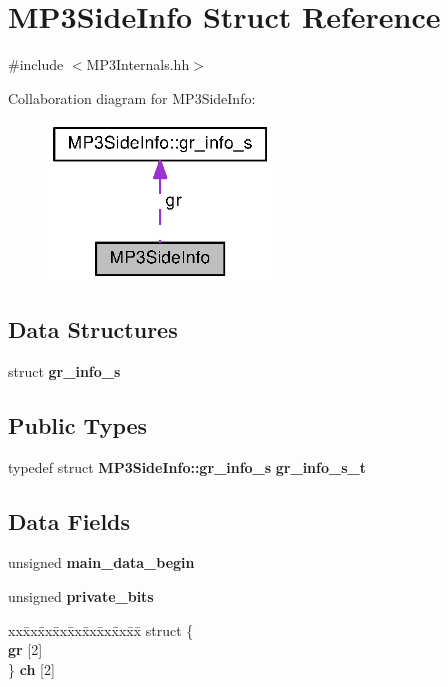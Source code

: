 \section{M\+P3\+Side\+Info Struct Reference}
\label{structMP3SideInfo}


{\ttfamily \#include $<$M\+P3\+Internals.\+hh$>$}



Collaboration diagram for M\+P3\+Side\+Info\+:
\nopagebreak
\begin{figure}[H]
\begin{center}
\leavevmode
\includegraphics[width=168pt]{structMP3SideInfo__coll__graph}
\end{center}
\end{figure}
\subsection*{Data Structures}
\begin{DoxyCompactItemize}
\item 
struct {\bf gr\+\_\+info\+\_\+s}
\end{DoxyCompactItemize}
\subsection*{Public Types}
\begin{DoxyCompactItemize}
\item 
typedef struct {\bf M\+P3\+Side\+Info\+::gr\+\_\+info\+\_\+s} {\bf gr\+\_\+info\+\_\+s\+\_\+t}
\end{DoxyCompactItemize}
\subsection*{Data Fields}
\begin{DoxyCompactItemize}
\item 
unsigned {\bf main\+\_\+data\+\_\+begin}
\item 
unsigned {\bf private\+\_\+bits}
\item 
\begin{tabbing}
xx\=xx\=xx\=xx\=xx\=xx\=xx\=xx\=xx\=\kill
struct \{\\
 {\bf gr} [2]\\
\} {\bf ch} [2]\\

\end{tabbing}\end{DoxyCompactItemize}


